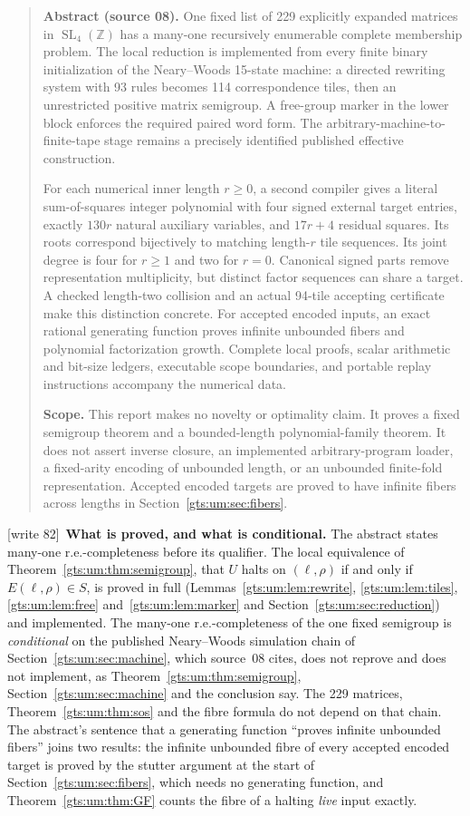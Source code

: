 \documentclass[11pt,letterpaper]{article}
\theoremstyle{definition}
\theoremstyle{remark}
\newcommand{\Z}{\mathbb Z}
\newcommand{\SL}{\operatorname{SL}}
\newcommand{\wtagc}{\textup{[write 82]}}
\begin{document}
\begin{quote}\small
\textbf{Abstract (source 08).} One fixed list of 229 explicitly expanded matrices in $\SL_4(\Z)$ has a many-one recursively enumerable complete membership problem. The local reduction is implemented from every finite binary initialization of the Neary--Woods 15-state machine: a directed rewriting system with 93 rules becomes 114 correspondence tiles, then an unrestricted positive matrix semigroup. A free-group marker in the lower block enforces the required paired word form. The arbitrary-machine-to-finite-tape stage remains a precisely identified published effective construction.

For each numerical inner length $r\geq0$, a second compiler gives a literal sum-of-squares integer polynomial with four signed external target entries, exactly $130r$ natural auxiliary variables, and $17r+4$ residual squares. Its roots correspond bijectively to matching length-$r$ tile sequences. Its joint degree is four for $r\geq1$ and two for $r=0$. Canonical signed parts remove representation multiplicity, but distinct factor sequences can share a target. A checked length-two collision and an actual 94-tile accepting certificate make this distinction concrete. For accepted encoded inputs, an exact rational generating function proves infinite unbounded fibers and polynomial factorization growth. Complete local proofs, scalar arithmetic and bit-size ledgers, executable scope boundaries, and portable replay instructions accompany the numerical data.

\medskip
\textbf{Scope.} This report makes no novelty or optimality claim. It proves a fixed semigroup theorem and a bounded-length polynomial-family theorem. It does not assert inverse closure, an implemented arbitrary-program loader, a fixed-arity encoding of unbounded length, or an unbounded finite-fold representation. Accepted encoded targets are proved to have infinite fibers across lengths in Section~\ref{gts:um:sec:fibers}.
\end{quote}

\wtagc\ \textbf{What is proved, and what is conditional.} The abstract states many-one r.e.-completeness before its qualifier. The local equivalence of Theorem~\ref{gts:um:thm:semigroup}, that $U$ halts on $(\ell,\rho)$ if and only if $E(\ell,\rho)\in S$, is proved in full (Lemmas~\ref{gts:um:lem:rewrite}, \ref{gts:um:lem:tiles}, \ref{gts:um:lem:free} and~\ref{gts:um:lem:marker} and Section~\ref{gts:um:sec:reduction}) and implemented. The many-one r.e.-completeness of the one fixed semigroup is \emph{conditional} on the published Neary--Woods simulation chain of Section~\ref{gts:um:sec:machine}, which source~08 cites, does not reprove and does not implement, as Theorem~\ref{gts:um:thm:semigroup}, Section~\ref{gts:um:sec:machine} and the conclusion say. The 229 matrices, Theorem~\ref{gts:um:thm:sos} and the fibre formula do not depend on that chain. The abstract's sentence that a generating function ``proves infinite unbounded fibers'' joins two results: the infinite unbounded fibre of every accepted encoded target is proved by the stutter argument at the start of Section~\ref{gts:um:sec:fibers}, which needs no generating function, and Theorem~\ref{gts:um:thm:GF} counts the fibre of a halting \emph{live} input exactly.
\end{document}
